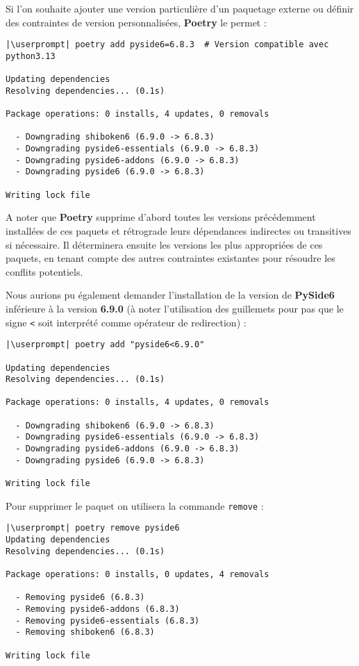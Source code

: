 Si l'on souhaite ajouter une version particulière d'un paquetage externe ou définir des contraintes de version personnalisées, \textbf{Poetry} le permet :
\begin{lstlisting}[style=bash]
|\userprompt| poetry add pyside6=6.8.3  # Version compatible avec python3.13

Updating dependencies
Resolving dependencies... (0.1s)

Package operations: 0 installs, 4 updates, 0 removals

  - Downgrading shiboken6 (6.9.0 -> 6.8.3)
  - Downgrading pyside6-essentials (6.9.0 -> 6.8.3)
  - Downgrading pyside6-addons (6.9.0 -> 6.8.3)
  - Downgrading pyside6 (6.9.0 -> 6.8.3)

Writing lock file
\end{lstlisting}

A noter que \textbf{Poetry} supprime d'abord toutes les versions précédemment installées de ces paquets et rétrograde leurs dépendances indirectes ou transitives si nécessaire. Il déterminera ensuite les versions les plus appropriées de ces paquets, en tenant compte des autres contraintes existantes pour résoudre les conflits potentiels.

Nous aurions pu également demander l'installation de la version de \textbf{PySide6} inférieure à la version \textbf{6.9.0} (à noter l'utilisation des guillemets pour pas que le signe \og \texttt{<} \fg{} soit interprété comme opérateur de redirection) :
\begin{lstlisting}[style=bash]
|\userprompt| poetry add "pyside6<6.9.0"

Updating dependencies
Resolving dependencies... (0.1s)

Package operations: 0 installs, 4 updates, 0 removals

  - Downgrading shiboken6 (6.9.0 -> 6.8.3)
  - Downgrading pyside6-essentials (6.9.0 -> 6.8.3)
  - Downgrading pyside6-addons (6.9.0 -> 6.8.3)
  - Downgrading pyside6 (6.9.0 -> 6.8.3)

Writing lock file
\end{lstlisting}

Pour supprimer le paquet on utilisera la commande \texttt{remove} :
\begin{lstlisting}[style=bash]
|\userprompt| poetry remove pyside6
Updating dependencies
Resolving dependencies... (0.1s)

Package operations: 0 installs, 0 updates, 4 removals

  - Removing pyside6 (6.8.3)
  - Removing pyside6-addons (6.8.3)
  - Removing pyside6-essentials (6.8.3)
  - Removing shiboken6 (6.8.3)

Writing lock file
\end{lstlisting}

